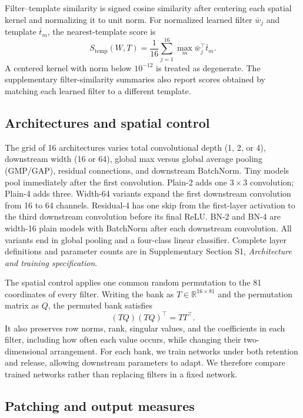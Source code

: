 \documentclass[pdflatex,sn-basic]{sn-jnl}
\begin{document}
Filter--template similarity is signed cosine similarity after centering each spatial kernel and normalizing it to unit norm. For normalized learned filter $\bar w_j$ and template $\bar t_m$, the nearest-template score is
\begin{equation}
S_{\mathrm{temp}}(W,T)
=\frac{1}{16}\sum_{j=1}^{16}\max_m \bar w_j^{\top}\bar t_m.
\label{eq:template-similarity}
\end{equation}
A centered kernel with norm below $10^{-12}$ is treated as degenerate. The supplementary filter-similarity summaries also report scores obtained by matching each learned filter to a different template.

\subsection{Architectures and spatial control}

The grid of 16 architectures varies total convolutional depth (1, 2, or 4), downstream width (16 or 64), global max versus global average pooling (GMP/GAP), residual connections, and downstream BatchNorm. Tiny models pool immediately after the first convolution. Plain-2 adds one $3\times3$ convolution; Plain-4 adds three. Width-64 variants expand the first downstream convolution from 16 to 64 channels. Residual-4 has one skip from the first-layer activation to the third downstream convolution before its final ReLU. BN-2 and BN-4 are width-16 plain models with BatchNorm after each downstream convolution. All variants end in global pooling and a four-class linear classifier. Complete layer definitions and parameter counts are in Supplementary Section S1, \emph{Architecture and training specification}.

The spatial control applies one common random permutation to the 81 coordinates of every filter. Writing the bank as $T\in\mathbb R^{16\times81}$ and the permutation matrix as $Q$, the permuted bank satisfies
\begin{equation}
(TQ)(TQ)^\top=TT^\top.
\label{eq:gram-control}
\end{equation}
It also preserves row norms, rank, singular values, and the coefficients in each filter, including how often each value occurs, while changing their two-dimensional arrangement. For each bank, we train networks under both retention and release, allowing downstream parameters to adapt. We therefore compare trained networks rather than replacing filters in a fixed network.

\subsection{Patching and output measures}
\end{document}
